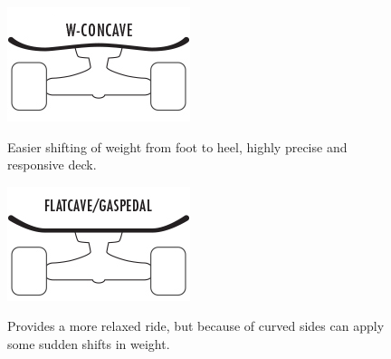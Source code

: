 \documentclass[titlepage, letterpaper,12pt]{article}
\begin{document}
\begin{itemize}
\begin{figure}[!htbp]\centering
\begin{minipage}{.5\textwidth}\centering
\includegraphics[width=.8\textwidth]{w-concave.jpg}
\label{w-concave}
\end{minipage}
\item Easier shifting of weight from foot to heel, highly precise and responsive deck.
\end{figure}

\begin{figure}[!htbp]\centering
\begin{minipage}{.5\textwidth}\centering
\includegraphics[width=.8\textwidth]{flatcave.jpg}
\label{flatcave}
\end{minipage}
\item Provides a more relaxed ride, but because of curved sides can apply some sudden shifts in weight.
\end{figure}


\end{itemize}
\end{document}
